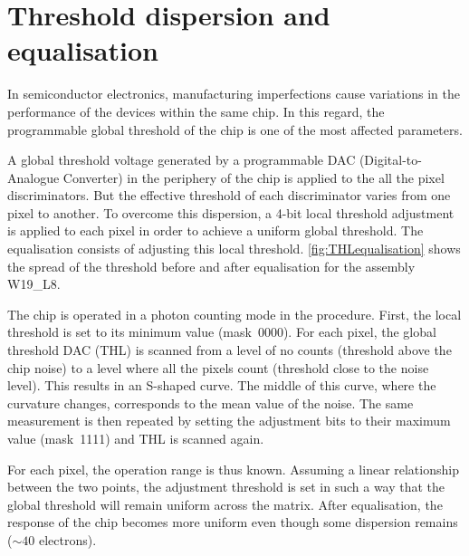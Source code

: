 \section{Threshold dispersion and equalisation} 
\label{sec:ThresholdEqualisation}


In semiconductor electronics, manufacturing imperfections cause
variations in the performance of the devices within the same chip. In
this regard, the programmable global threshold of the chip is one of
the most affected parameters. 

A global threshold voltage generated by a programmable DAC
(Digital-to-Analogue Converter) in the periphery of the chip is
applied to the all the pixel discriminators. But the effective
threshold of each discriminator varies from one pixel to another. To
overcome this dispersion, a 4-bit local threshold adjustment is
applied to each pixel in order to achieve a uniform global
threshold. The equalisation consists of adjusting this local
threshold. \cref{fig:THLequalisation} shows the spread of the
threshold before and after equalisation for the assembly W19\_L8.

The chip is operated in a photon counting mode in the
procedure. First, the local threshold is set to its minimum value
(mask~0000). For each pixel, the global threshold DAC (THL) is scanned
from a level of no counts (threshold above the chip noise) to a level
where all the pixels count (threshold close to the noise level). This
results in an S-shaped curve. The middle of this curve, where the
curvature changes, corresponds to the mean value of the noise. The
same measurement is then repeated by setting the adjustment bits to
their maximum value (mask~1111) and THL is scanned again.

For each pixel, the operation range is thus known. Assuming a linear
relationship between the two points, the adjustment threshold is set
in such a way that the global threshold will remain uniform across the
matrix. After equalisation, the response of the chip becomes more
uniform even though some dispersion remains ($\sim40$ electrons).


